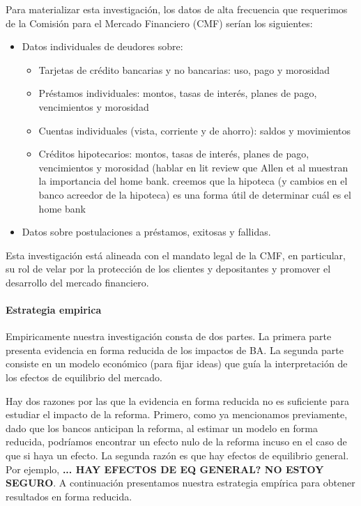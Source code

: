\documentclass[11pt]{article}
\theoremstyle{plain}
\theoremstyle{plain}
\begin{document}
Para materializar esta investigación, 
los datos de alta frecuencia que requerimos de la Comisión para el Mercado Financiero (CMF) serían los siguientes:


\begin{itemize}
    \item Datos individuales de deudores sobre:
    \begin{itemize}
        \item Tarjetas de crédito bancarias y no bancarias: uso, pago y morosidad
        \item Préstamos individuales: montos, tasas de interés, planes de pago, vencimientos y morosidad
        \item Cuentas individuales (vista, corriente y de ahorro): saldos y movimientos
        \item Créditos hipotecarios: montos, tasas de interés, planes de pago, vencimientos y morosidad (hablar en lit review que Allen et al muestran la importancia del home bank. creemos que la hipoteca (y cambios en el banco acreedor de la hipoteca) es una forma útil de determinar cuál es el home bank
    \end{itemize}
    \item Datos sobre postulaciones a préstamos, exitosas y fallidas.
\end{itemize}


Esta investigación está alineada con el mandato legal de la CMF, en particular, su rol de velar por la protección de los clientes y depositantes y promover el desarrollo del mercado financiero. 


 

\paragraph{Estrategia empirica}

Empiricamente nuestra investigación consta de dos partes. La primera parte presenta evidencia en forma reducida de los impactos de BA. La segunda parte consiste en un modelo económico (para fijar ideas) que guía la interpretación de los efectos de equilibrio del mercado.

Hay dos razones por las que la evidencia en forma reducida no es suficiente para estudiar el impacto de la reforma. Primero, como ya mencionamos previamente, dado que los bancos anticipan la reforma, al estimar un modelo en forma reducida, podríamos encontrar un efecto nulo  de la reforma incuso en el caso de que si haya un efecto. La segunda razón es que hay efectos de equilibrio general. Por ejemplo, \textbf{... HAY EFECTOS DE EQ GENERAL? NO ESTOY SEGURO}. A continuación presentamos nuestra estrategia empírica para obtener resultados en forma reducida. 
\end{document}
